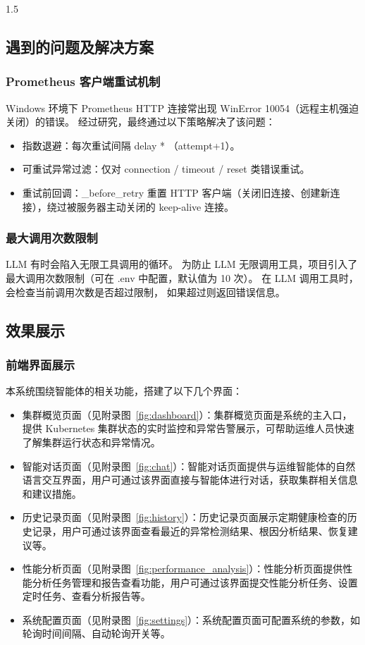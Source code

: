 \documentclass[a4paper,12pt]{report}
\begin{document}
\begin{spacing}{1.5}
\subsection{遇到的问题及解决方案}
\subsubsection{Prometheus 客户端重试机制}
Windows 环境下 Prometheus HTTP 连接常出现 WinError 10054（远程主机强迫关闭）的错误。
经过研究，最终通过以下策略解决了该问题：
\begin{itemize}
	\item 指数退避：每次重试间隔 delay * （attempt+1）。
	\item 可重试异常过滤：仅对 connection / timeout / reset 类错误重试。
	\item 重试前回调：\_before\_retry 重置 HTTP 客户端（关闭旧连接、创建新连接），绕过被服务器主动关闭的 keep-alive 连接。
\end{itemize}

\subsubsection{最大调用次数限制}
LLM 有时会陷入无限工具调用的循环。
为防止 LLM 无限调用工具，项目引入了最大调用次数限制（可在 .env 中配置，默认值为 10 次）。
在 LLM 调用工具时，会检查当前调用次数是否超过限制，
如果超过则返回错误信息。

\subsection{效果展示}
\subsubsection{前端界面展示}
本系统围绕智能体的相关功能，搭建了以下几个界面：
\begin{itemize}
	\item 集群概览页面（见附录图~\ref{fig:dashboard}）：集群概览页面是系统的主入口，提供 Kubernetes 集群状态的实时监控和异常告警展示，可帮助运维人员快速了解集群运行状态和异常情况。
	\item 智能对话页面（见附录图~\ref{fig:chat}）：智能对话页面提供与运维智能体的自然语言交互界面，用户可通过该界面直接与智能体进行对话，获取集群相关信息和建议措施。
	\item 历史记录页面（见附录图~\ref{fig:history}）：历史记录页面展示定期健康检查的历史记录，用户可通过该界面查看最近的异常检测结果、根因分析结果、恢复建议等。
	\item 性能分析页面（见附录图~\ref{fig:performance_analysis}）：性能分析页面提供性能分析任务管理和报告查看功能，用户可通过该界面提交性能分析任务、设置定时任务、查看分析报告等。
	\item 系统配置页面（见附录图~\ref{fig:settings}）：系统配置页面可配置系统的参数，如轮询时间间隔、自动轮询开关等。
\end{itemize}


\end{spacing}
\end{document}
